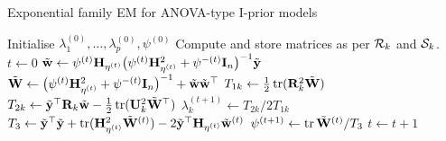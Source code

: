 \begin{algorithm}[hbt]
\caption{Exponential family EM for ANOVA-type I-prior models}\label{alg:EM2}
\begin{algorithmic}[1]
    \State Initialise $\lambda_1^{(0)},\dots,\lambda_p^{(0)}, \psi^{(0)}$
    \State Compute and store matrices as per ${\mathcal R}_k$ and ${\mathcal S}_k$.
    \State $t \gets 0$
  \EndProcedure 
  \Statex
      \State $\tilde{\mathbf w} \gets \psi^{(t)} {\mathbf H}_{\eta^{(t)}} \big(\psi^{(t)} {\mathbf H}_{\eta^{(t)}}^2 + \psi^{-(t)}{\mathbf I}_n \big)^{-1} \tilde{{\mathbf y}}$
      \State $\tilde{\mathbf W} \gets \big(\psi^{(t)} {\mathbf H}_{\eta^{(t)}}^2 + \psi^{-(t)}{\mathbf I}_n \big)^{-1} + \tilde{\mathbf w}\tilde{\mathbf w}^{\top}$
    \EndProcedure
    \Statex
        \State $T_{1k} \gets \frac{1}{2} \operatorname{tr}({\mathbf R}_k^2 \tilde{\mathbf W})$
        \State $T_{2k} \gets \tilde{{\mathbf y}}^\top {\mathbf R}_k \tilde{\mathbf w} - \frac{1}{2} \operatorname{tr}({\mathbf U}_k^2 \tilde{\mathbf W}^\top)$
        \State $\lambda_k^{(t+1)} \gets T_{2k} / 2T_{1k}$
      \EndFor
      \State $T_3 \gets \tilde{{\mathbf y}}^\top\tilde{{\mathbf y}} + \operatorname{tr}({\mathbf H}_{\eta^{(t)}}^2\tilde{\mathbf W}^{(t)}) - 2\tilde{{\mathbf y}}^\top{\mathbf H}_{\eta^{(t)}}\tilde{\mathbf w}^{(t)}$
      \State $\psi^{(t+1)} \gets \operatorname{tr} \tilde{\mathbf W}^{(t)} / T_3$
    \EndProcedure
    \State $t \gets t+1$
  \EndWhile
\end{algorithmic}
\end{algorithm}



